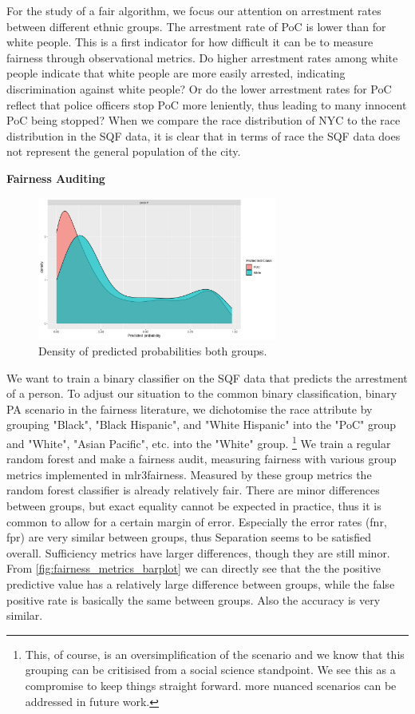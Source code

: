 For the study of a fair algorithm, we focus our attention on arrestment rates between different ethnic groups.
The arrestment rate of PoC is lower than for white people. This is a first indicator for how difficult it can be to measure fairness through observational metrics. Do higher arrestment rates among white people indicate that white people are more easily arrested, indicating discrimination against white people? Or do the lower arrestment rates for PoC reflect that police officers stop PoC more leniently, thus leading to many innocent PoC being stopped?
When we compare the race distribution of NYC to the race distribution in the SQF data, it is clear that in terms of race the SQF data does not represent the general population of the city.

\textbf{Fairness Auditing}
\begin{figure}
    \centering
    \includegraphics[width=0.7\textwidth]{../figures/sqf_case_study_plot1.png}
    \caption{Density of predicted probabilities both groups.}
    \label{fig:fairness_density}
\end{figure}
We want to train a binary classifier on the SQF data that predicts the arrestment of a person. To adjust our situation to the common binary classification, binary PA scenario in the fairness literature, we
dichotomise the race attribute by grouping "Black", "Black Hispanic", and "White Hispanic" into the "PoC" group and "White", "Asian Pacific", etc. into the "White" group. \footnote{This, of course, is an oversimplification of the scenario and we know that this grouping can be critisised from a social science standpoint. We see this as a compromise to keep things straight forward. more nuanced scenarios can be addressed in future work.} 
We train a regular random forest and make a fairness audit, measuring fairness with various group metrics implemented in mlr3fairness.
Measured by these group metrics the random forest classifier is already relatively fair. There are minor differences between groups, but exact equality cannot be expected in practice, thus it is common to allow for a certain margin of error.
Especially the error rates (fnr, fpr) are very similar between groups, thus Separation seems to be satisfied overall. Sufficiency metrics have larger differences, though they are still minor. From \autoref{fig:fairness_metrics_barplot} we can directly see that the the positive predictive value has a relatively large difference between groups, while the false positive rate is basically the same between groups. Also the accuracy is very similar.

